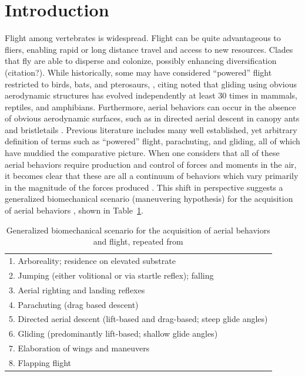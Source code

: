 \section*{Introduction}
Flight among vertebrates is widespread.  Flight can be quite advantageous to fliers, enabling rapid or long distance travel and access to new resources.  Clades that fly are able to disperse and colonize, possibly enhancing diversification (citation?).  While historically, some may have considered ``powered'' flight restricted to birds, bats, and pterosaurs, \citet{Dudley:2011}, citing \citep{Rayner:1988, Norberg:1990} noted that gliding using obvious aerodynamic structures has evolved independently at least 30 times in mammals, reptiles, and amphibians.  Furthermore, aerial behaviors can occur in the absence of obvious aerodynamic surfaces, such as in directed aerial descent in canopy ants \citep{Yanoviak:2005, Yanoviak:2011} and bristletails \citep{Yanoviak:2008}.  Previous literature includes many well established, yet arbitrary definition of terms such as ``powered'' flight, parachuting, and gliding, all of which have muddied the comparative picture.  When one considers that all of these aerial behaviors require production and control of forces and moments in the air, it becomes clear that these are all a continuum of behaviors which vary primarily in the magnitude of the forces produced \citep{Dudley:2011}.  This shift in perspective suggests a generalized biomechanical scenario (maneuvering hypothesis) for the acquisition of aerial behaviors \citep{Dudley:2011}, shown in Table~\ref{tbl:scenario}.   
\begin{table}
\caption{Generalized biomechanical scenario for the acquisition of aerial behaviors and flight, repeated from \citep{Dudley:2011}}
\label{tbl:scenario}
\begin{center}
\begin{tabular}{l}
1. Arboreality; residence on elevated substrate \\
2. Jumping (either volitional or via startle reflex); falling \\
3. Aerial righting and landing reflexes \\
4. Parachuting (drag based descent) \\
5. Directed aerial descent (lift-based and drag-based; steep glide angles) \\
6. Gliding (predominantly lift-based; shallow glide angles) \\
7. Elaboration of wings and maneuvers \\
8. Flapping flight \\
\end{tabular}
\end{center}
\end{table}

